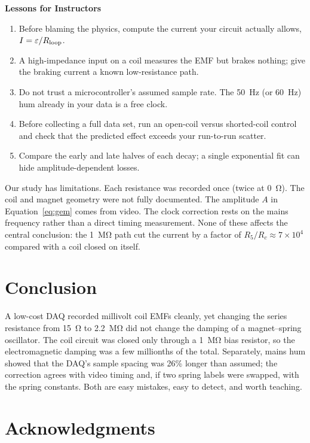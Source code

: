 \documentclass[12pt,a4paper]{article}
\begin{document}
\begin{mdframed}[linewidth=0.6pt,innertopmargin=6pt,innerbottommargin=6pt,nobreak=true]
\textbf{Lessons for Instructors}
\begin{enumerate}
\item Before blaming the physics, compute the current your circuit actually allows, $I = \varepsilon/R_{\rm loop}$.
\item A high-impedance input on a coil measures the EMF but brakes nothing; give the braking current a known low-resistance path.
\item Do not trust a microcontroller's assumed sample rate. The \SI{50}{Hz} (or \SI{60}{Hz}) hum already in your data is a free clock.
\item Before collecting a full data set, run an open-coil versus shorted-coil control and check that the predicted effect exceeds your run-to-run scatter.
\item Compare the early and late halves of each decay; a single exponential fit can hide amplitude-dependent losses.
\end{enumerate}
\end{mdframed}

Our study has limitations. Each resistance was recorded once (twice at \SI{0}{\ohm}). The coil and magnet geometry were not fully documented. The amplitude $A$ in Equation~\ref{eq:gem} comes from video. The clock correction rests on the mains frequency rather than a direct timing measurement. None of these affects the central conclusion: the \SI{1}{\mega\ohm} path cut the current by a factor of $R_5/R_c \approx 7\times10^{4}$ compared with a coil closed on itself.

\section{Conclusion}

A low-cost DAQ recorded millivolt coil EMFs cleanly, yet changing the series resistance from \SI{15}{\ohm} to \SI{2.2}{\mega\ohm} did not change the damping of a magnet--spring oscillator. The coil circuit was closed only through a \SI{1}{\mega\ohm} bias resistor, so the electromagnetic damping was a few millionths of the total. Separately, mains hum showed that the DAQ's sample spacing was 26\% longer than assumed; the correction agrees with video timing and, if two spring labels were swapped, with the spring constants. Both are easy mistakes, easy to detect, and worth teaching.


\section{Acknowledgments}
\end{document}
